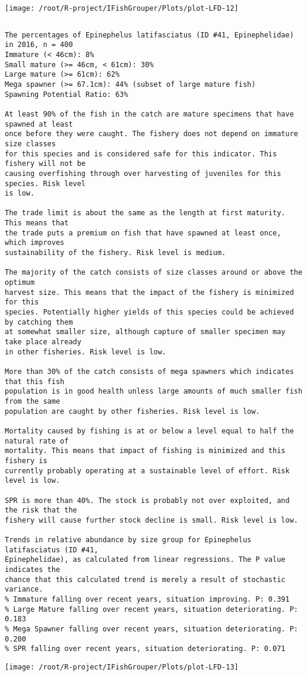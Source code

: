 \documentclass{report}\usepackage[]{graphicx}\usepackage[]{color}
\makeatletter
\def\maxwidth{ %
  \ifdim\Gin@nat@width>\linewidth
    \linewidth
  \else
    \Gin@nat@width
  \fi
}
\newenvironment{kframe}{%
 \def\at@end@of@kframe{}%
 \ifinner\ifhmode%
  \def\at@end@of@kframe{\end{minipage}}%
  \begin{minipage}{\columnwidth}%
 \fi\fi%
 \def\FrameCommand##1{\hskip\@totalleftmargin \hskip-\fboxsep
 \colorbox{shadecolor}{##1}\hskip-\fboxsep
     \hskip-\linewidth \hskip-\@totalleftmargin \hskip\columnwidth}%
 \MakeFramed {\advance\hsize-\width
   \@totalleftmargin\z@ \linewidth\hsize
   \@setminipage}}%
 {\par\unskip\endMakeFramed%
 \at@end@of@kframe}
\newenvironment{knitrout}{}{} %
\makeatother
\begin{document}
\begin{knitrout}
\texttt{[image: /root/R-project/IFishGrouper/Plots/plot-LFD-12]} 
\begin{kframe}\begin{verbatim}
\end{verbatim}
\end{kframe}
\clearpage
\newpage
\begin{kframe}\begin{verbatim}The percentages of Epinephelus latifasciatus (ID #41, Epinephelidae) in 2016, n = 400
Immature (< 46cm): 8%
Small mature (>= 46cm, < 61cm): 30%
Large mature (>= 61cm): 62%
Mega spawner (>= 67.1cm): 44% (subset of large mature fish)
Spawning Potential Ratio: 63%
 
At least 90% of the fish in the catch are mature specimens that have spawned at least
once before they were caught. The fishery does not depend on immature size classes
for this species and is considered safe for this indicator. This fishery will not be
causing overfishing through over harvesting of juveniles for this species. Risk level
is low.

The trade limit is about the same as the length at first maturity.  This means that
the trade puts a premium on fish that have spawned at least once, which improves
sustainability of the fishery. Risk level is medium.

The majority of the catch consists of size classes around or above the optimum
harvest size. This means that the impact of the fishery is minimized for this
species. Potentially higher yields of this species could be achieved by catching them
at somewhat smaller size, although capture of smaller specimen may take place already
in other fisheries. Risk level is low.

More than 30% of the catch consists of mega spawners which indicates that this fish
population is in good health unless large amounts of much smaller fish from the same
population are caught by other fisheries. Risk level is low.
 
Mortality caused by fishing is at or below a level equal to half the natural rate of
mortality. This means that impact of fishing is minimized and this fishery is
currently probably operating at a sustainable level of effort. Risk level is low.
 
SPR is more than 40%. The stock is probably not over exploited, and the risk that the
fishery will cause further stock decline is small. Risk level is low.
 
Trends in relative abundance by size group for Epinephelus latifasciatus (ID #41,
Epinephelidae), as calculated from linear regressions. The P value indicates the
chance that this calculated trend is merely a result of stochastic variance.
% Immature falling over recent years, situation improving. P: 0.391
% Large Mature falling over recent years, situation deteriorating. P: 0.183
% Mega Spawner falling over recent years, situation deteriorating. P: 0.200
% SPR falling over recent years, situation deteriorating. P: 0.071
\end{verbatim}
\end{kframe}
\texttt{[image: /root/R-project/IFishGrouper/Plots/plot-LFD-13]} 


\end{knitrout}
\end{document}
